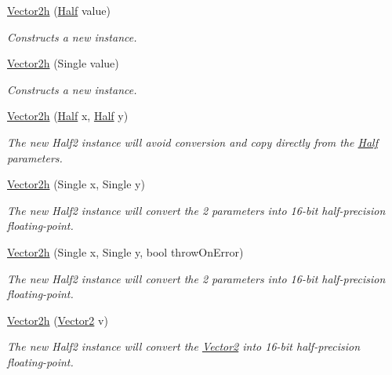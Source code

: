 \begin{DoxyCompactItemize}
\item 
\hyperlink{struct_open_t_k_1_1_vector2h_a74a5bbb4039983a4abd1694c6812ad91}{Vector2h} (\hyperlink{struct_open_t_k_1_1_half}{Half} value)
\begin{DoxyCompactList}\small\item\em Constructs a new instance. \end{DoxyCompactList}\item 
\hyperlink{struct_open_t_k_1_1_vector2h_a8da51c1139b35d24254b0f9f0a20c7f0}{Vector2h} (Single value)
\begin{DoxyCompactList}\small\item\em Constructs a new instance. \end{DoxyCompactList}\item 
\hyperlink{struct_open_t_k_1_1_vector2h_a151e9027d2c30aeb3cf30e7e290d8eb5}{Vector2h} (\hyperlink{struct_open_t_k_1_1_half}{Half} x, \hyperlink{struct_open_t_k_1_1_half}{Half} y)
\begin{DoxyCompactList}\small\item\em The new Half2 instance will avoid conversion and copy directly from the \hyperlink{struct_open_t_k_1_1_half}{Half} parameters. \end{DoxyCompactList}\item 
\hyperlink{struct_open_t_k_1_1_vector2h_ab8bcb23918e71c829bd98f3348d39543}{Vector2h} (Single x, Single y)
\begin{DoxyCompactList}\small\item\em The new Half2 instance will convert the 2 parameters into 16-\/bit half-\/precision floating-\/point. \end{DoxyCompactList}\item 
\hyperlink{struct_open_t_k_1_1_vector2h_ae585f7db6a05ae7a23082ef25f993965}{Vector2h} (Single x, Single y, bool throw\-On\-Error)
\begin{DoxyCompactList}\small\item\em The new Half2 instance will convert the 2 parameters into 16-\/bit half-\/precision floating-\/point. \end{DoxyCompactList}\item 
\hyperlink{struct_open_t_k_1_1_vector2h_a4f01d1106542ec6f543283e5e34a5c25}{Vector2h} (\hyperlink{struct_open_t_k_1_1_vector2}{Vector2} v)
\begin{DoxyCompactList}\small\item\em The new Half2 instance will convert the \hyperlink{struct_open_t_k_1_1_vector2}{Vector2} into 16-\/bit half-\/precision floating-\/point. \end{DoxyCompactList}\item 

\end{DoxyCompactItemize}
